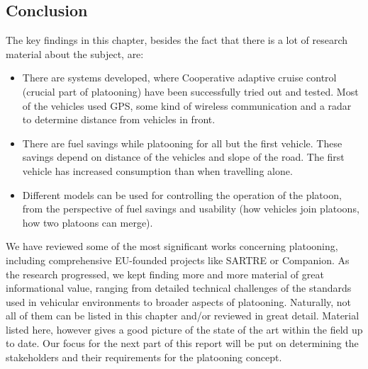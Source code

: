 \subsection{Conclusion}
The key findings in this chapter, besides the fact that there is a lot of research material about the subject, are:
\begin{itemize}[noitemsep]
    \item There are systems developed, where Cooperative adaptive cruise control (crucial part of platooning) have been successfully tried out and tested. Most of the vehicles used GPS, some kind of wireless communication and a radar to determine distance from vehicles in front.
    \item There are fuel savings while platooning for all but the first vehicle. These savings depend on distance of the vehicles and slope of the road. The first vehicle has increased consumption than when travelling alone.
    \item Different models can be used for controlling the operation of the platoon, from the perspective of fuel savings and usability (how vehicles join platoons, how two platoons can merge).
\end{itemize}
% 
We have reviewed some of the most significant works concerning platooning, including comprehensive EU-founded projects like SARTRE or Companion. As the research progressed, we kept finding more and more material of great informational value, ranging from detailed technical challenges of the standards used in vehicular environments to broader aspects of platooning. Naturally, not all of them can be listed in this chapter and/or reviewed in great detail. Material listed here, however gives a good picture of the state of the art within the field up to date. Our focus for the next part of this report will be put on determining the stakeholders and their requirements for the platooning concept.\par

